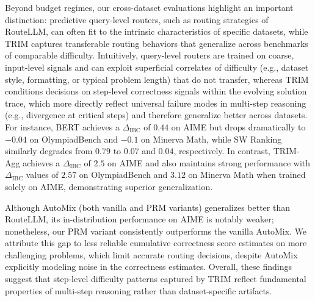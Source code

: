 \documentclass{article}
\theoremstyle{plain}
\theoremstyle{definition}
\theoremstyle{remark}
\begin{document}
Beyond budget regimes, our cross-dataset evaluations highlight an important distinction: predictive query-level routers, such as routing strategies of RouteLLM, can often fit to the intrinsic characteristics of specific datasets, while TRIM captures transferable routing behaviors that generalize across benchmarks of comparable difficulty.  Intuitively, query-level routers are trained on coarse, input-level signals and can exploit superficial correlates of difficulty (e.g., dataset style, formatting, or typical problem length) that do not transfer, whereas TRIM conditions decisions on step-level correctness signals within the evolving solution trace, which more directly reflect universal failure modes in multi-step reasoning (e.g., divergence at critical steps) and therefore generalize better across datasets.
For instance, BERT achieves a $\Delta_{\text{IBC}}$ of $0.44$ on AIME but drops dramatically to $-0.04$ on OlympiadBench and $-0.1$ on Minerva Math, while SW Ranking similarly degrades from $0.79$ to $0.07$ and $0.04$, respectively. In contrast, TRIM-Agg achieves a $\Delta_{\text{IBC}}$ of $2.5$ on AIME and also maintains strong performance with $\Delta_{\text{IBC}}$ values of $2.57$ on OlympiadBench and $3.12$ on Minerva Math when trained solely on AIME, demonstrating superior generalization. 

Although AutoMix (both vanilla and PRM variants) generalizes better than RouteLLM, its in-distribution performance on AIME is notably weaker; nonetheless, our PRM variant consistently outperforms the vanilla AutoMix. We attribute this gap to less reliable cumulative correctness score estimates on more challenging problems, which limit accurate routing decisions, despite AutoMix explicitly modeling noise in the correctness estimates. Overall, these findings suggest that step-level difficulty patterns captured by TRIM reflect fundamental properties of multi-step reasoning rather than dataset-specific artifacts.
\end{document}
